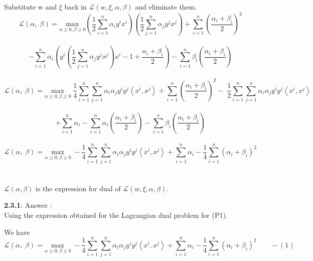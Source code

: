 \documentclass[a4paper,11pt]{article}
\begin{document}
\begin{mlsolution}
Substitute w and $\xi$ back in $\mathcal{L}(w, \xi, \alpha, \beta)$ and eliminate them.\\

\[
  \mathcal{L}\left ( \alpha,\; \beta  \right ) = \underset{\alpha\geq 0, \beta \geq 0 }{\text{max}} \left ( \frac{1}{2}\sum_{i=1}^{n} \alpha_{i}y^{i}x^{i}  \right )\left ( \frac{1}{2}\sum_{j=1}^{n} \alpha_{j}y^{j}x^{j} \right ) + \sum_{i=1}^{n} \left ( \frac{\alpha_{i} + \beta_{i}}{2} \right )^{2}  \]\\\[ - \sum_{i=1}^{n} \alpha_{i}\left ( y^{i}\left ( \frac{1}{2}\sum_{j=1}^{n} \alpha_{j}y^{j}x^{j}  \right )x^{i} - 1  +  \frac{\alpha_{i} + \beta_{i}}{2} \right ) - \sum_{i=1}^{n} \beta_{i} \left ( \frac{\alpha_{i} + \beta_{i}}{2}  \right )
\]\\

\[
  \mathcal{L}\left ( \alpha,\; \beta  \right ) = \underset{\alpha\geq 0, \beta \geq 0 }{\text{max}} \; \frac{1}{4}\sum_{i=1}^{n}\sum_{j=1}^{n}\alpha_{i}\alpha_{j}y^{i}y^{j}\left \langle x^{i}, x^{j} \right \rangle+ \sum_{i=1}^{n} \left ( \frac{\alpha_{i} + \beta_{i}}{2} \right )^{2} -\; \frac{1}{2}\sum_{i=1}^{n}\sum_{j=1}^{n}\alpha_{i}\alpha_{j}y^{i}y^{j}\left \langle x^{i}, x^{j} \right \rangle \]\\\[ + \sum_{i=1}^{n}\alpha_{i} - \sum_{i=1}^{n} \alpha_{i} \left ( \frac{\alpha_{i} + \beta_{i}}{2}  \right ) - \sum_{i=1}^{n} \beta_{i} \left ( \frac{\alpha_{i} + \beta_{i}}{2}  \right )
\]\\

\[
  \mathcal{L}\left ( \alpha,\; \beta  \right ) = \underset{\alpha\geq 0, \beta \geq 0 }{\text{max}} \; -\frac{1}{4}\sum_{i=1}^{n}\sum_{j=1}^{n}\alpha_{i}\alpha_{j}y^{i}y^{j}\left \langle x^{i}, x^{j} \right \rangle+ \sum_{i=1}^{n}\alpha_{i} - \frac{1}{4}\sum_{i=1}^{n} \left ( \alpha_{i} + \beta_{i} \right )^{2}
\]\\\\

$\mathcal{L}(\alpha, \beta)$ is the expression for dual of $\mathcal{L}(w, \xi, \alpha, \beta)$.\\
\newpage

\textbf{2.3.1}: Answer : \\

Using the expression obtained for the Lagrangian dual problem for (P1).

We have 
\[
  \mathcal{L}\left ( \alpha,\; \beta  \right ) = \underset{\alpha\geq 0, \beta \geq 0 }{\text{max}} \; -\frac{1}{4}\sum_{i=1}^{n}\sum_{j=1}^{n}\alpha_{i}\alpha_{j}y^{i}y^{j}\left \langle x^{i}, x^{j} \right \rangle+ \sum_{i=1}^{n}\alpha_{i} - \frac{1}{4}\sum_{i=1}^{n} \left ( \alpha_{i} + \beta_{i} \right )^{2} \;\;\;\;\;\;\; - (1)
\]\\


\end{mlsolution}
\end{document}
